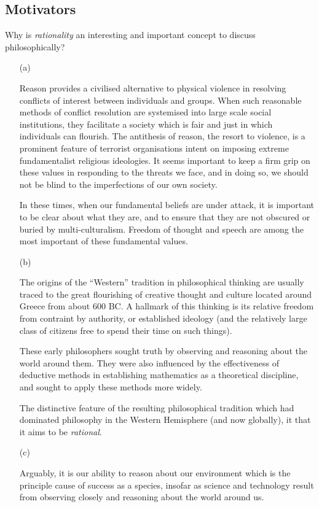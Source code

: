\documentclass[14pt,titlepage]{extarticle}
\begin{document}
\subsection{Motivators}

Why is {\it rationality} an interesting and important concept to discuss philosophically?

\begin{itemize}

\item[(a)]


Reason provides a civilised alternative
to physical violence in resolving conflicts of interest between individuals and groups.
When such reasonable methods of conflict resolution are systemised into large scale
social institutions, they facilitate a society which is fair and just in which individuals
can flourish.
The antithesis of reason, the resort to violence, is a prominent feature of terrorist
organisations intent on imposing extreme fundamentalist religious ideologies.
It seems important to keep a firm grip on these values in responding to the threats
we face, and in doing so, we should not be blind to the imperfections of our own
society.

In these times, when our fundamental beliefs are under attack, it is important to
be clear about what they are, and to ensure that they are not obscured or buried
by multi-culturalism.
Freedom of thought and speech are among the most important of these fundamental
values.

\item[(b)]

The origins of the ``Western'' tradition in philosophical thinking are usually traced to
the great flourishing of creative thought and culture located around Greece from about
600 BC.
A hallmark of this thinking is its relative freedom from contraint by authority, or established
ideology (and the relatively large class of citizens free to spend their time on such things).

These early philosophers sought truth by observing and reasoning about the world around them.
They were also influenced by the effectiveness of deductive methods in establishing mathematics
as a theoretical discipline, and sought to apply these methods more widely.

The distinctive feature of the resulting philosophical tradition which had dominated philosophy
in the Western Hemisphere (and now globally), it that it aims to be {\it rational}.

\item[(c)]

Arguably, it is our ability to reason about our environment which is the principle cause
of success as a species, insofar as science and technology result from observing closely
and reasoning about the world around us.

\end{itemize}
\end{document}
